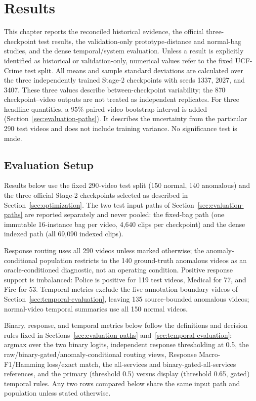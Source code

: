 \chapter{Results}
\label{chap:results}

This chapter reports the reconciled historical evidence, the official three-checkpoint test results, the validation-only prototype-distance and normal-bag studies, and the dense temporal/system evaluation. Unless a result is explicitly identified as historical or validation-only, numerical values refer to the fixed UCF-Crime test split. All means and sample standard deviations are calculated over the three independently trained Stage-2 checkpoints with seeds 1337, 2027, and 3407. These three values describe between-checkpoint variability; the 870 checkpoint--video outputs are not treated as independent replicates. For three headline quantities, a 95\% paired video bootstrap interval is added (Section~\ref{sec:evaluation-paths}). It describes the uncertainty from the particular 290 test videos and does not include training variance. No significance test is made.

\section{Evaluation Setup}
\label{sec:results-setup}
\label{sec:results-protocol}

Results below use the fixed 290-video test split (150 normal, 140 anomalous) and the three official Stage-2 checkpoints selected as described in Section~\ref{sec:optimization}. The two test input paths of Section~\ref{sec:evaluation-paths} are reported separately and never pooled: the fixed-bag path (one immutable 16-instance bag per video, 4,640 clips per checkpoint) and the dense indexed path (all 69,090 indexed clips).

Response routing uses all 290 videos unless marked otherwise; the anomaly-conditional population restricts to the 140 ground-truth anomalous videos as an oracle-conditioned diagnostic, not an operating condition. Positive response support is imbalanced: Police is positive for 119 test videos, Medical for 77, and Fire for 53. Temporal metrics exclude the five annotation-boundary videos of Section~\ref{sec:temporal-evaluation}, leaving 135 source-bounded anomalous videos; normal-video temporal summaries use all 150 normal videos.

Binary, response, and temporal metrics below follow the definitions and decision rules fixed in Sections~\ref{sec:evaluation-paths} and~\ref{sec:temporal-evaluation}: argmax over the two binary logits, independent response thresholding at 0.5, the raw/binary-gated/anomaly-conditional routing views, Response Macro-F1/Hamming loss/exact match, the all-services and binary-gated-all-services references, and the primary (threshold 0.5) versus display (threshold 0.65, gated) temporal rules. Any two rows compared below share the same input path and population unless stated otherwise.

